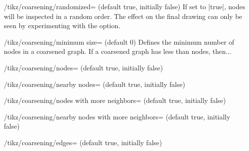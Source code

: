 \begin{key}{/tikz/coarsening/randomized= (default
  true, initially false)}
  If set to |true|, nodes will be inspected in a random order. The
  effect on the final drawing can only be seen by experimenting with the
  option.
  \begin{codeexample}[]
  \end{codeexample}
\end{key}

\begin{key}{/tikz/coarsening/minimum size= (default 0)}
  Defines the minimum number of nodes in a coarsened graph. If a
  coarsened graph has less than  nodes, then... %
  \begin{codeexample}[] 
  \end{codeexample}
\end{key}

\begin{key}{/tikz/coarsening/nodes= (default true,
  initially false)}
  \begin{codeexample}[]
  \end{codeexample}
\end{key}

\begin{key}{/tikz/coarsening/nearby nodes= (default
  true, initially false)}
  \begin{codeexample}[]
  \end{codeexample}
\end{key}

\begin{key}{/tikz/coarsening/nodes with more 
  neighbors= (default true, initially false)}
  \begin{codeexample}[]
  \end{codeexample}
\end{key}

\begin{key}{/tikz/coarsening/nearby nodes with more 
  neighbors= (default true, initially false)}
  \begin{codeexample}[]
  \end{codeexample}
\end{key}

\begin{key}{/tikz/coarsening/edges= (default true,
  initially false)}
  \begin{codeexample}[]
  \end{codeexample}
\end{key}

